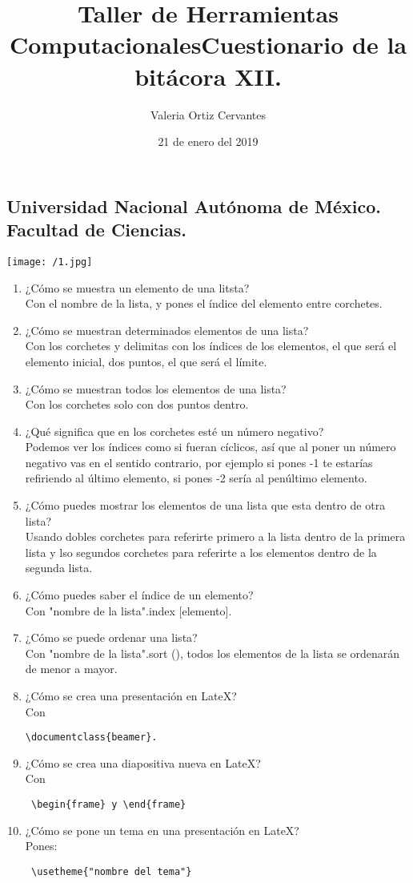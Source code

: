 \documentclass{article} %
\title{\Huge Taller de Herramientas Computacionales}
\author{\huge Valeria Ortiz Cervantes}
\date{\LARGE 21 de enero del 2019}
\begin{document}
\maketitle
\begin{center}
	\subsection*{\LARGE Universidad Nacional Autónoma de México.\\Facultad de Ciencias.\\}
	\texttt{[image: /1.jpg]}
\end{center}
\newpage
\title{\LARGE Cuestionario de la bitácora XII.}
\begin{enumerate}
	\item ¿Cómo se muestra un elemento de una litsta?\\Con el nombre de la lista, y pones el índice del elemento entre corchetes. 
	\item ¿Cómo se muestran determinados elementos de una lista?\\Con los corchetes y delimitas con los índices de los elementos, el que será el elemento inicial, dos puntos, el que será el límite. 
	\item ¿Cómo se muestran todos los elementos de una lista?\\Con los corchetes solo con dos puntos dentro. 
	\item ¿Qué significa que en los corchetes esté un número negativo?\\Podemos ver los índices como si fueran cíclicos, así que al poner un número negativo vas en el sentido contrario, por ejemplo si pones -1 te estarías refiriendo al último elemento, si pones -2 sería al penúltimo elemento.
	\item ¿Cómo puedes mostrar los elementos de una lista que esta dentro de otra lista?\\Usando dobles corchetes para referirte primero a la lista dentro de la primera lista y lso segundos corchetes para referirte a los elementos dentro de la segunda lista.
	\item ¿Cómo puedes saber el índice de un elemento?\\Con "nombre de la lista".index [elemento].
	\item ¿Cómo se puede ordenar una lista?\\ Con "nombre de la lista".sort (), todos los elementos de la lista se ordenarán de menor a mayor.
	\item ¿Cómo se crea una presentación en LateX?\\Con\begin{verbatim}\documentclass{beamer}. \end{verbatim}
	\item ¿Cómo se crea una diapositiva nueva en LateX?\\Con\begin{verbatim} \begin{frame} y \end{frame}\end{verbatim}
	\item ¿Cómo se pone un tema en una presentación en LateX?\\Pones: \begin{verbatim} \usetheme{"nombre del tema"}
	\end{verbatim}
\end{enumerate}
\end{document}
